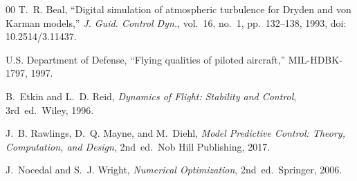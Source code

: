 \documentclass[conference]{IEEEtran}
\begin{document}
\begin{thebibliography}{00}
T.~R. Beal, ``Digital simulation of atmospheric turbulence for Dryden and von Karman models,'' \emph{J. Guid. Control Dyn.}, vol.~16, no.~1, pp.~132--138, 1993, doi: 10.2514/3.11437.

U.S. Department of Defense, ``Flying qualities of piloted aircraft,'' MIL-HDBK-1797, 1997.

B.~Etkin and L.~D. Reid, \emph{Dynamics of Flight: Stability and Control}, 3rd~ed.\ Wiley, 1996.

J.~B. Rawlings, D.~Q. Mayne, and M.~Diehl, \emph{Model Predictive Control: Theory, Computation, and Design}, 2nd~ed.\ Nob Hill Publishing, 2017.

J.~Nocedal and S.~J. Wright, \emph{Numerical Optimization}, 2nd~ed.\ Springer, 2006.

\end{thebibliography}
\end{document}
